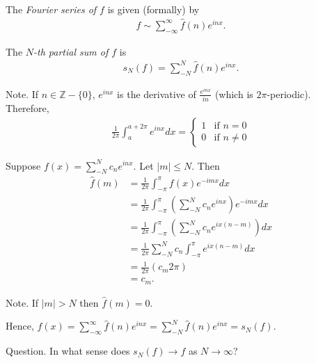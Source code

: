 \documentclass[11pt]{article}
\begin{document}
\begin{definition} The \emph{Fourier series of $f$} is given (formally) by \begin{align*} f \sim \sum_{- \infty}^\infty \hat{f}(n) e^{inx}.
\end{align*}
\end{definition}

\begin{definition} The \emph{$N$-th partial sum of $f$} is \begin{align*}  s_N(f) = \sum_{-N}^N \hat{f}(n) e^{inx}.
\end{align*}
\end{definition}

Note.  If $n \in \mathbb{Z} - \{ 0 \}$, $e^{inx}$ is the derivative of $\frac{e^{inx}}{in}$ (which is $2\pi$-periodic). Therefore, \begin{align*} \frac{1}{2\pi} \int_a^{a+2\pi} e^{inx} dx = \begin{cases} 1 & \text{if } n = 0 \\ 0 & \text{if } n \neq 0 \end{cases}
\end{align*}

\begin{example} Suppose $f(x) = \sum_{-N}^N c_n e^{inx}$. Let $|m| \le N$. Then \begin{align*} \hat{f}(m) & = \frac{1}{2\pi} \int_{-\pi}^\pi f(x) e^{-imx} dx \\ & = \frac{1}{2\pi} \int_{-\pi}^\pi \left( \sum_{-N}^N c_n e^{inx} \right) e^{-imx} dx \\ & = \frac{1}{2\pi} \int_{-\pi}^\pi \left( \sum_{-N}^N c_n e^{ix(n - m)} \right) dx\\ & = \frac{1}{2\pi} \sum_{-N}^N c_n \int_{-\pi}^\pi e^{ix(n - m)} dx \\ & = \frac{1}{2\pi} (c_m 2\pi) \\ & = c_m.  \end{align*}

Note. If $|m| > N$ then $\hat{f}(m) = 0$.

Hence, $f(x) = \sum_{-\infty}^\infty \hat{f}(n) e^{inx} = \sum_{-N}^N \hat{f}(n) e^{inx} = s_N (f)$.
\end{example}

Question. In what sense does $s_N(f) \to f$ as $N \to \infty$?
\end{document}
